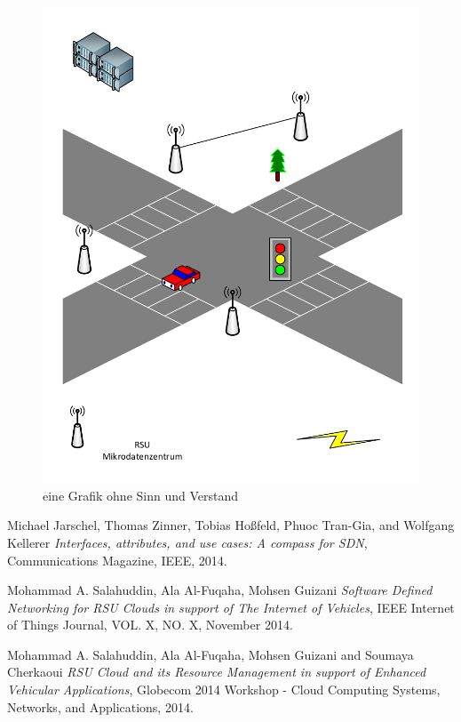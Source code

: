 \documentclass[conference]{IEEEtran}
\begin{document}
\begin{figure}
	\centering
	\includegraphics[scale=0.6]{strasse.pdf}
	\caption{eine Grafik ohne Sinn und Verstand}
	\label{img:grafik-dummy}
\end{figure}
\newpage

\begin{thebibliography}{1}

Michael Jarschel, Thomas Zinner, Tobias Hoßfeld, Phuoc Tran-Gia, and Wolfgang Kellerer \emph{Interfaces, attributes, and use cases: A compass for SDN}, Communications Magazine, IEEE, 2014.

Mohammad A. Salahuddin, Ala Al-Fuqaha, Mohsen Guizani \emph{Software Defined Networking for RSU Clouds in support of The Internet of Vehicles}, IEEE Internet of Things Journal, VOL. X, NO. X, November 2014.

Mohammad A. Salahuddin, Ala Al-Fuqaha, Mohsen Guizani and Soumaya Cherkaoui \emph{RSU Cloud and its Resource Management in
support of Enhanced Vehicular Applications}, Globecom 2014 Workshop - Cloud Computing Systems, Networks, and Applications, 2014.

\end{thebibliography}
\end{document}
